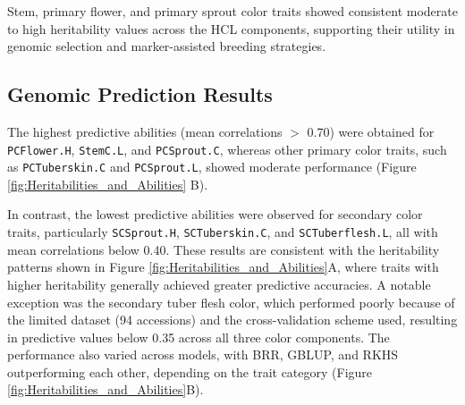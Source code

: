 \documentclass[pdflatex,sn-mathphys-ay]{sn-jnl}%
\begin{document}
Stem, primary flower, and primary sprout color traits showed consistent moderate to high heritability values across the HCL components, supporting their utility in genomic selection and marker-assisted breeding strategies.

\subsection{Genomic Prediction Results}


The highest predictive abilities (mean correlations $>$ 0.70) were obtained for \texttt{PCFlower.H}, \texttt{StemC.L}, and \texttt{PCSprout.C}, whereas other primary color traits, such as \texttt{PCTuberskin.C} and \texttt{PCSprout.L}, showed moderate performance (Figure \ref{fig:Heritabilities_and_Abilities} B).


In contrast, the lowest predictive abilities were observed for secondary color traits, particularly \texttt{SCSprout.H}, \texttt{SCTuberskin.C}, and \texttt{SCTuberflesh.L}, all with mean correlations below 0.40. These results are consistent with the heritability patterns shown in Figure \ref{fig:Heritabilities_and_Abilities}A, where traits with higher heritability generally achieved greater predictive accuracies. A notable exception was the secondary tuber flesh color, which performed poorly because of the limited dataset (94 accessions) and the cross-validation scheme used, resulting in predictive values below 0.35 across all three color components. The performance also varied across models, with BRR, GBLUP, and RKHS outperforming each other, depending on the trait category (Figure \ref{fig:Heritabilities_and_Abilities}B).




\end{document}
